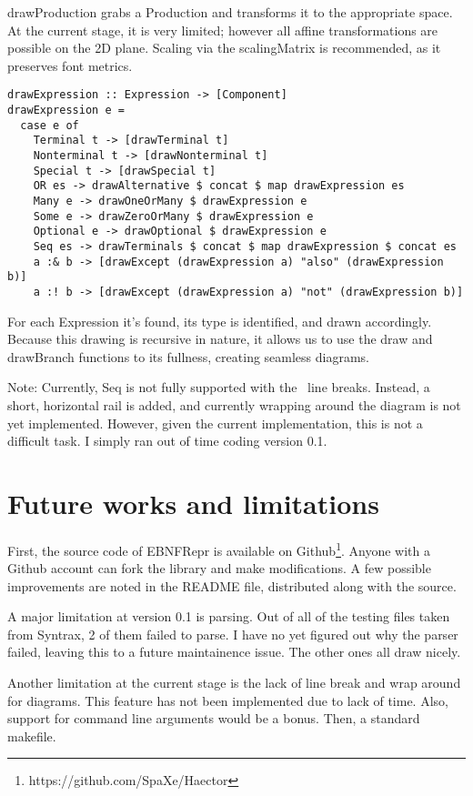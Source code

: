 \documentclass[a4paper]{article}
\begin{document}
drawProduction grabs a Production and transforms it to the appropriate space. At the current stage, it is very limited; however all affine transformations are possible on the 2D plane. Scaling via the scalingMatrix is recommended, as it preserves font metrics.
  
\begin{verbatim}
drawExpression :: Expression -> [Component]
drawExpression e = 
  case e of
    Terminal t -> [drawTerminal t]
    Nonterminal t -> [drawNonterminal t]
    Special t -> [drawSpecial t]
    OR es -> drawAlternative $ concat $ map drawExpression es
    Many e -> drawOneOrMany $ drawExpression e
    Some e -> drawZeroOrMany $ drawExpression e
    Optional e -> drawOptional $ drawExpression e
    Seq es -> drawTerminals $ concat $ map drawExpression $ concat es
    a :& b -> [drawExcept (drawExpression a) "also" (drawExpression b)]
    a :! b -> [drawExcept (drawExpression a) "not" (drawExpression b)]
\end{verbatim}

For each Expression it's found, its type is identified, and drawn accordingly. Because this drawing is recursive in nature, it allows us to use the draw and drawBranch functions to its fullness, creating seamless diagrams.

Note: Currently, Seq is not fully supported with the \ line breaks. Instead, a short, horizontal rail is added, and currently wrapping around the diagram is not yet implemented. However, given the current implementation, this is not a difficult task. I simply ran out of time coding version 0.1.

\section{Future works and limitations}
First, the source code of EBNFRepr is available on Github\footnote{https://github.com/SpaXe/Haector}. Anyone with a Github account can fork the library and make modifications. A few possible improvements are noted in the README file, distributed along with the source.

A major limitation at version 0.1 is parsing. Out of all of the testing files taken from Syntrax, 2 of them failed to parse. I have no yet figured out why the parser failed, leaving this to a future maintainence issue. The other ones all draw nicely.

Another limitation at the current stage is the lack of line break and wrap around for diagrams. This feature has not been implemented due to lack of time. Also, support for command line arguments would be a bonus. Then, a standard makefile.
\end{document}
